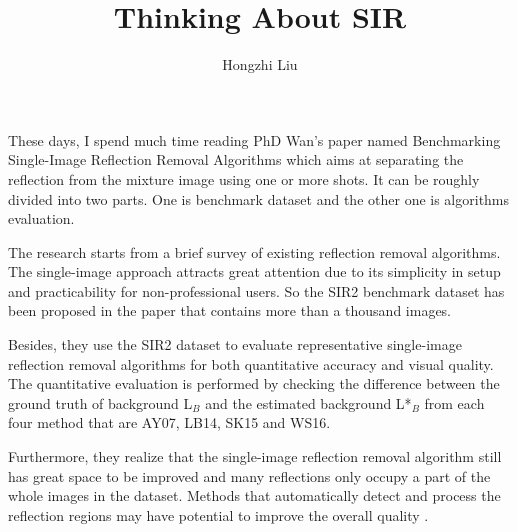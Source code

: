 \documentclass{article}
\author{Hongzhi Liu}
\title{Thinking About SIR}
\begin{document}
\maketitle
  \par
  These days, I spend much time reading PhD Wan's paper named Benchmarking Single-Image Reflection Removal Algorithms which aims at separating the reflection from the mixture image using one or more shots. It can be roughly divided into two parts. One is benchmark dataset and the other one is algorithms evaluation.

  The research starts from a brief survey of existing reflection removal algorithms. The single-image approach attracts great attention due to its simplicity in setup and practicability for non-professional users. So the SIR2 benchmark dataset has been proposed in the paper that contains more than a thousand images.

   Besides, they use the SIR2 dataset to evaluate representative single-image reflection removal algorithms for both quantitative accuracy and visual quality. The quantitative evaluation is performed by checking the difference between the ground truth of background L$_B$ and the estimated background L*$_B$ from each four method that are AY07, LB14, SK15 and WS16.

   Furthermore, they realize that the single-image reflection removal algorithm still has great space to be improved and many reflections only occupy a part of the whole images in the dataset. Methods that automatically detect and process the reflection regions may have potential to improve the overall quality \cite{Wan2017Benchmarking}.



\end{document}
